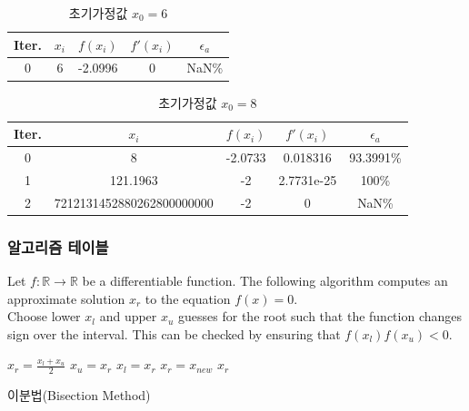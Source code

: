 \begin{table}[!hbpt]
\centering
\begin{tabular}{c|c|c|c|c}
\hline\hline
Iter.&$x_{i}$&$f(x_{i})$&$f'(x_{i})$&$\epsilon_{a}$\\
\hline
0&6&-2.0996&0&NaN\%\\
\hline\hline
\end{tabular}
\caption{초기가정값 $x_{0}=6$}
\end{table}

\begin{table}[!hbpt]
\centering
\begin{tabular}{c|c|c|c|c}
\hline\hline
Iter.&$x_{i}$&$f(x_{i})$&$f'(x_{i})$&$\epsilon_{a}$\\
\hline
0&8&-2.0733&0.018316&93.3991\%\\
1&121.1963&-2&2.7731e-25&100\%\\
2&7212131452880262800000000&-2&0&NaN\%\\
\hline\hline
\end{tabular}
\caption{초기가정값 $x_{0}=8$}
\end{table}

\clearpage
\subsubsection{알고리즘 테이블}

\begin{algorithm}\label{alg:c5}
Let $f:\mathbb{R}\rightarrow\mathbb{R}$ be a differentiable function. The following algorithm computes an approximate solution $x_{r}$ to the equation $f(x)=0$.\\
Choose lower $x_{l}$ and upper $x_{u}$ guesses for the root such that the function changes sign over the interval. This can be checked by ensuring that $f(x_{l})f(x_{u})<0$.
\begin{algorithmic}
  \State $x_{r}=\frac{x_{l}+x_{u}}{2}$
    \State $x_{u}=x_{r}$
  \Else
    \State $x_{l}=x_{r}$
  \EndIf  
    \State $x_{r}=x_{new}$
    \State \Return $x_{r}$
  \EndIf
\EndWhile
\end{algorithmic}
\caption{이분법(Bisection Method)}
\end{algorithm}

